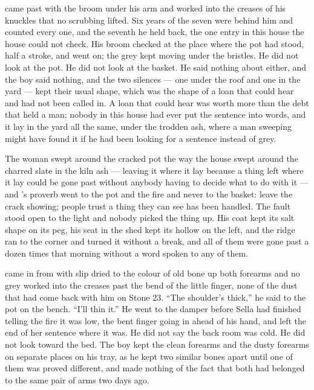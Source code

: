  came past with the broom under his arm and  worked into the creases of his knuckles that no scrubbing lifted. Six years of the seven were behind him and counted every one, and the seventh he held back, the one entry in this house the house could not check. His broom checked at the place where the pot had stood, half a stroke, and went on; the grey kept moving under the bristles. He did not look at the pot. He did not look at the basket. He said nothing about either, and the boy said nothing, and the two silences --- one under the roof and one in the yard --- kept their usual shape, which was the shape of a loan that could hear and had not been called in. A loan that could hear was worth more than the debt that held a man; nobody in this house had ever put the sentence into words, and it lay in the yard all the same, under the trodden ash, where a man sweeping might have found it if he had been looking for a sentence instead of grey.

The woman swept around the cracked pot the way the house swept around the charred slate in the kiln ash --- leaving it where it lay because a thing left where it lay could be gone past without anybody having to decide what to do with it --- and 's proverb went to the pot and the fire and never to the basket: leave the crack showing; people trust a thing they can see has been handled. The fault stood open to the light and nobody picked the thing up. His coat kept its salt shape on its peg, his seat in the shed kept its hollow on the left, and the ridge ran to the corner and turned it without a break, and all of them were gone past a dozen times that morning without a word spoken to any of them.

 came in from  with slip dried to the colour of old bone up both forearms and no grey worked into the creases past the bend of the little finger, none of the dust that had come back with him on Stone 23. “The shoulder's thick,” he said to the pot on the bench. “I'll thin it.” He went to the damper before Sella had finished telling the fire it was low, the bent finger going in ahead of his hand, and left the end of her sentence where it was. He did not say the back room was cold. He did not look toward the bed. The boy kept the clean forearms and the dusty forearms on separate places on his tray, as he kept two similar bones apart until one of them was proved different, and made nothing of the fact that both had belonged to the same pair of arms two days ago.

